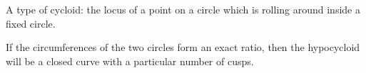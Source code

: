 A type of cycloid: the locus of a point on a circle which is rolling around 
inside a fixed circle.
\par
If the circumferences of the two circles form an exact ratio, then the
hypocycloid will be a closed curve with a particular number of cusps.